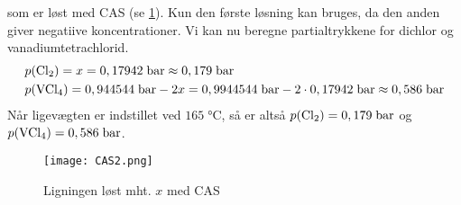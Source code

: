 \documentclass{report}
\begin{document}
som er løst med CAS (se \cref{fig:CAS2}).
Kun den første løsning kan bruges, da den anden giver negatiive koncentrationer.
Vi kan nu beregne partialtrykkene for dichlor og vanadiumtetrachlorid.
\begin{equation*}
\begin{split}
  &p(\ce{Cl2} )=x=0,17942 \;\unit{bar} \approx 0,179 \;\unit{bar} \\
  &p(\ce{VCl4} )=0,944544 \;\unit{bar} -2x = 0,9944544 \;\unit{bar} - 2 \cdot 0,17942 \;\unit{bar} \approx 0,586 \;\unit{bar} 
\end{split}
\end{equation*}
Når ligevægten er indstillet ved $165 \;\unit{\celsius} $, så er altså $p(\ce{Cl2} )=0,179 \;\unit{bar} $ og $p(\ce{VCl4} )=0,586 \;\unit{bar} $. 
\begin{figure}[H]
\begin{center}
  \texttt{[image: CAS2.png]}
\end{center}
\caption{Ligningen løst mht. $x$ med CAS }
\label{fig:CAS2}
\end{figure}
\end{document}
